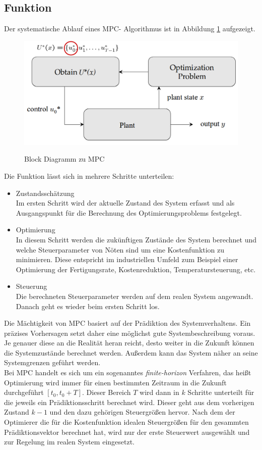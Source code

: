\documentclass{like}
\begin{document}
\subsection{Funktion}
Der systematische Ablauf eines \ac{MPC}- Algorithmus ist in Abbildung \ref{fig:mpcBlock} aufgezeigt.  

  \begin{figure}[ht!]
  	\caption{Block Diagramm zu MPC}
  	\includegraphics[width=350pt]{Abbildungen/mpcBlockDiagram.png}
  	\label{fig:mpcBlock}
  \end{figure}

Die Funktion lässt sich in mehrere Schritte unterteilen:
\begin{itemize}
	\item Zustandsschätzung \\ Im ersten Schritt wird der aktuelle Zustand des System erfasst und als Ausgangspunkt für die Berechnung des Optimierungsproblems festgelegt.
	\item Optimierung \\ In diesem Schritt werden die zukünftigen Zustände des System berechnet und welche Steuerparameter von Nöten sind um eine Kostenfunktion zu minimieren. Diese entspricht im industriellen Umfeld zum Beispiel einer Optimierung der Fertigungsrate, Kostenreduktion,  Temperatursteuerung, etc.
	\item Steuerung \\ Die berechneten Steuerparameter werden auf dem realen System angewandt. Danach geht es wieder beim ersten Schritt los.   
\end{itemize}


Die Mächtigkeit von \ac{MPC} basiert auf der Prädiktion des Systemverhaltens. Ein präzises Vorhersagen setzt daher eine möglichst gute Systembeschreibung voraus. Je genauer diese an die Realität heran reicht, desto weiter in die Zukunft können die Systemzustände berechnet werden. Außerdem kann das System näher an seine Systemgrenzen geführt werden. \\
Bei \acl{MPC} handelt es sich um ein sogenanntes \textit{finite-horizon} Verfahren, das heißt Optimierung wird immer für einen bestimmten Zeitraum in die Zukunft durchgeführt $ [t_0, t_0 + T] $. Dieser Bereich \(T\) wird dann in \(k\) Schritte unterteilt für die jeweils ein Prädiktionsschritt berechnet wird. Dieser geht aus dem vorherigen Zustand $k -1$ und den dazu gehörigen Steuergrößen hervor. Nach dem der Optimierer die für die Kostenfunktion idealen Steuergrößen für den gesammten Prädiktionsvektor berechnet hat, wird nur der erste Steuerwert ausgewählt und zur Regelung im realen System eingesetzt. \\
\end{document}
